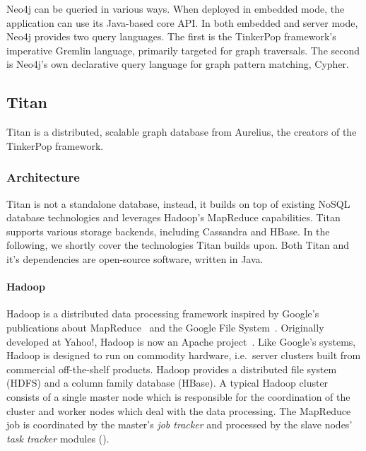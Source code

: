 Neo4j can be queried in various ways. When deployed in embedded mode, the application can use its Java-based core API. In both embedded and server mode, Neo4j provides two query languages. The first is the TinkerPop framework's imperative Gremlin language, primarily targeted for graph traversals. The second is Neo4j's own declarative query language for graph pattern matching, Cypher. 


\subsection{Titan}
\label{titan}

Titan is a distributed, scalable graph database from Aurelius, the creators of the TinkerPop framework. 

\subsubsection{Architecture}

Titan is not a standalone database, instead, it builds on top of existing NoSQL database technologies and leverages Hadoop's MapReduce capabilities. Titan supports various storage backends, including Cassandra and HBase. In the following, we shortly cover the technologies Titan builds upon. Both Titan and it's dependencies are open-source software, written in Java.

\paragraph{Hadoop}

Hadoop is a distributed data processing framework inspired by Google's publications about MapReduce~\cite{Dean:2008:MSD:1327452.1327492} and the Google File System~\cite{Ghemawat:2003:GFS:945445.945450}. Originally developed at Yahoo!, Hadoop is now an Apache project~\cite{Hadoop}. Like Google's systems, Hadoop is designed to run on commodity hardware, i.e.\ server clusters built from commercial off-the-shelf products. Hadoop provides a distributed file system (HDFS) and a column family database (HBase). %
A typical Hadoop cluster consists of a single master node which is responsible for the coordination of the cluster and worker nodes which deal with the data processing. The MapReduce job is coordinated by the master's \emph{job tracker} and processed by the slave nodes' \emph{task tracker} modules ().

